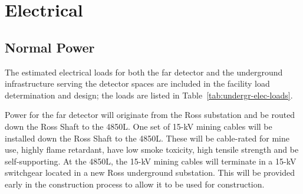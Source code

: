 \section{Electrical}
\label{sec:fscf-und-elec}


\subsection{Normal Power}
\label{sec:fscf-und-norm-pwr}

The estimated electrical loads for both the far detector and the underground infrastructure serving the detector spaces are included in the facility load determination and design; the loads are listed in Table~\ref{tab:undergr-elec-loads}. 

Power for the far detector will originate from the Ross substation and be routed down the Ross Shaft to the 4850L. One set of 15-kV mining cables will be installed down the Ross Shaft to the 4850L. These will be cable-rated for mine use, highly flame retardant, have low smoke toxicity, high tensile strength and be self-supporting. At the 4850L, the 15-kV mining cables will terminate in a 15-kV switchgear located in a new Ross underground substation. This will be provided early in the construction process to allow it to be used for construction.


